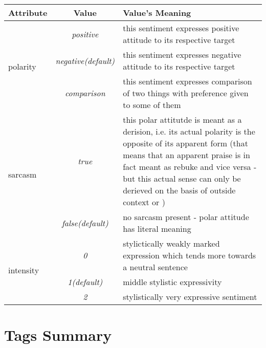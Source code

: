\documentclass[11pt,a4paper]{article}
\begin{document}
\begin{tabular}{|l|c|p{}|}\hline
  Attribute & Value & Value's Meaning\\\hline

  \multirow{3}{*}{polarity} & \textit{positive} & this sentiment
  expresses positive attitude to its respective target\\\cline{2-3}

  & \textit{negative\newline(default)} & this sentiment
  expresses negative attitude to its respective target\\\cline{2-3}

  & \textit{comparison} & this sentiment expresses comparison of two
  things with preference given to some of them\\\hline


  \multirow{2}{*}{sarcasm} & \textit{true} & this polar attitutde is
  meant as a derision, i.e. its actual polarity is the opposite of its
  apparent form (that means that an apparent praise is in fact meant
  as rebuke and vice versa - but this actual sense can only be
  derieved on the basis of outside context or )\\\cline{2-3}

  & \textit{false\newline(default)} & no sarcasm present - polar
  attitude has literal meaning\\\hline

  \multirow{3}{*}{intensity} & \textit{0} & stylictically weakly
  marked expression which tends more towards a neutral
  sentence\\\cline{2-3}

  & \textit{1\newline(default)} & middle stylistic
  expressivity\\\cline{2-3}

  & \textit{2} & stylistically very expressive sentiment\\\hline
\end{tabular}

\section{Tags Summary}
\end{document}

